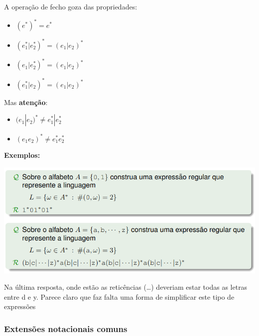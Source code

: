 \documentclass{article}
\begin{document}
\begin{flushleft}
  \pagebreak

  \item A operação de fecho goza das propriedades:
  \begin{itemize}
    \item $(e^*)^* = e^*$
    \item $(e_1^* | e_2^*)^* = (e_1 | e_2)^*$
    \item $(e_1 | e_2^*)^* = (e_1 | e_2)^*$
    \item $(e_1^* | e_2)^* = (e_1 | e_2)^*$
  \end{itemize}
  \item Mas \textbf{atenção}:
  \begin{itemize}
    \item $(e_1 | e_2)^* \ne e_1^* | e_2^*$
    \item $(e_1  e_2)^* \ne e_1^*  e_2^*$
  \end{itemize}

  \textbf{Exemplos:}

  \begin{center}
    \includegraphics[scale=0.4]{3}
  \end{center}
    Na  última resposta, onde estão as reticências (\dots) deveriam estar todas as letras
  entre d e y. Parece claro que faz falta uma forma de simplificar este tipo de
  expressões
\end{flushleft}


\subsubsection{Extensões notacionais comuns}
\end{document}
